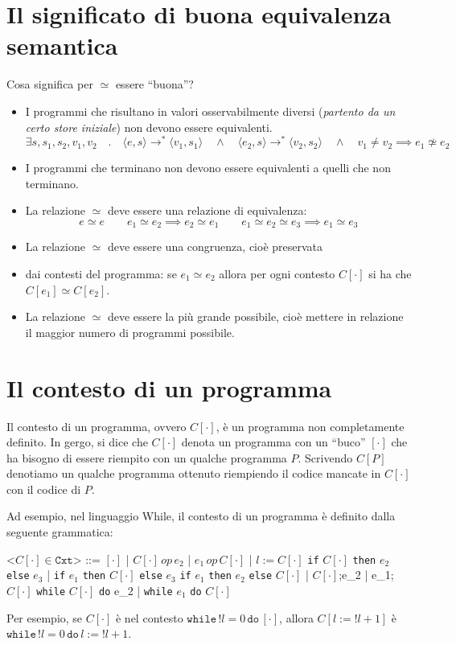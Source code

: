 \section{Il significato di buona equivalenza semantica}
Cosa significa per $\simeq$ essere ``buona''? 
\begin{itemize}
    \item I programmi che risultano in valori osservabilmente diversi (\textit{partento 
    da un certo store iniziale}) non devono essere equivalenti.
    \[
        \exists s, s_1, s_2, v_1, v_2 \quad . \quad \langle e, s \rangle 
        \rightarrow^* \langle v_1, s_1 \rangle \quad \land \quad 
        \langle e_2, s \rangle \rightarrow^*
        \langle v_2, s_2 \rangle \quad \land \quad v_1 \neq v_2 \implies
        e_1 \not \simeq e_2
    \]
    \item I programmi che terminano non devono essere equivalenti a quelli che non
    terminano.
    \item La relazione $\simeq$ deve essere una relazione di equivalenza:
    \[
        e \simeq e \qquad e_1 \simeq e_2 \implies e_2 \simeq e_1 \qquad 
        e_1 \simeq e_2 \simeq e_3 \implies e_1 \simeq e_3
    \]
    \item La relazione $\simeq$ deve essere una congruenza, cioè preservata 
    \item dai contesti del programma: se $e_1 \simeq e_2$
    allora per ogni contesto $C[\cdot]$ si ha che $C[e_1] \simeq C[e_2]$.
    \item La relazione $\simeq$ deve essere la più grande possibile, cioè
    mettere in relazione il maggior numero di programmi possibile.
\end{itemize}
\section{Il contesto di un programma}
Il contesto di un programma, ovvero $C[\cdot]$, è un programma non 
completamente definito. In gergo, si dice che $C[\cdot]$ denota un 
programma con un ``buco'' $[\cdot]$ che ha bisogno di essere riempito 
con un qualche programma $P$.
Scrivendo $C[P]$ denotiamo un qualche programma ottenuto riempiendo il
codice mancate in $C[\cdot]$ con il codice di $P$.

Ad esempio, nel linguaggio While, il contesto di un programma è definito
dalla seguente grammatica:
\begin{grammar}
    <$C[\cdot] \in \texttt{Cxt}$> ::= $[\cdot]$ | $C[\cdot] \, \textit{op} \, e_2$ |
    $e_1 \, \textit{op} \, C[\cdot]$ | $l:= C[\cdot]$ \alt
    \texttt{if} $C[\cdot]$ \texttt{then} $e_2$ \texttt{else} $e_3$ |
    \texttt{if} $e_1$ \texttt{then} $C[\cdot]$ \texttt{else} $e_3$ \alt
    \texttt{if} $e_1$ \texttt{then} $e_2$ \texttt{else} $C[\cdot]$ |
    $C[\cdot]$;e_2 | e_1;$C[\cdot]$ \alt 
    \texttt{while} $C[\cdot]$ \texttt{do} e_2
    | \texttt{while} $e_1$ \texttt{do} $C[\cdot]$
\end{grammar}
Per esempio, se $C[\cdot]$ è nel contesto $\texttt{while} \, !l = 0 \,
\texttt{do}\, [\cdot]$, allora $C[l:=!l + 1]$ è 
$\texttt{while} \, !l = 0 \, \texttt{do}\, l:=!l + 1$.
